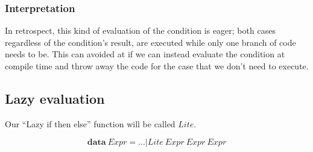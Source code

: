 \documentclass {article}
\begin{document}
\subsubsection{Interpretation}

%

In retrospect, this kind of evaluation of the condition
is eager; both cases regardless of the
condition's result, are executed
while only one branch of code needs to be.
This can avoided at if we can instead
evaluate the condition at compile time
and throw away the code for the case
that we don't need to execute.

\subsection{Lazy evaluation}

\newcommand{\lite}{$Lite$}

Our ``Lazy if then else'' function
 will be called \lite.

	\[ \textbf{data}\ Expr = ... | Lite\ Expr\ Expr\ Expr \]
\end{document}
